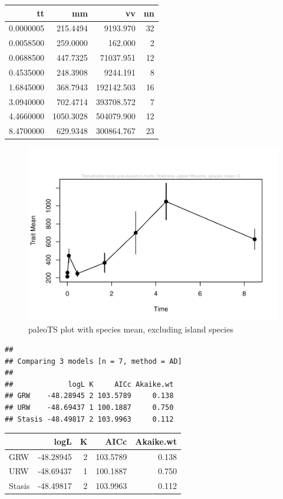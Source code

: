 \documentclass[]{article}
\begin{document}
\begin{longtable}[]{@{}rrrr@{}}
\toprule
tt & mm & vv & nn\tabularnewline
\midrule
\endhead
0.0000005 & 215.4494 & 9193.970 & 32\tabularnewline
0.0058500 & 259.0000 & 162.000 & 2\tabularnewline
0.0688500 & 447.7325 & 71037.951 & 12\tabularnewline
0.4535000 & 248.3908 & 9244.191 & 8\tabularnewline
1.6845000 & 368.7943 & 192142.503 & 16\tabularnewline
3.0940000 & 702.4714 & 393708.572 & 7\tabularnewline
4.4660000 & 1050.3028 & 504079.900 & 12\tabularnewline
8.4700000 & 629.9348 & 300864.767 & 23\tabularnewline
\bottomrule
\end{longtable}

\begin{figure}[htbp]
\centering
\includegraphics{MA_JJ_files/figure-latex/paleoTS plot with species mean, excluding island species-1.pdf}
\caption{paleoTS plot with species mean, excluding island species}
\end{figure}

\begin{verbatim}
## 
## Comparing 3 models [n = 7, method = AD]
## 
##             logL K     AICc Akaike.wt
## GRW    -48.28945 2 103.5789     0.138
## URW    -48.69437 1 100.1887     0.750
## Stasis -48.49817 2 103.9963     0.112
\end{verbatim}

\begin{longtable}[]{@{}lrrrr@{}}
\toprule
& logL & K & AICc & Akaike.wt\tabularnewline
\midrule
\endhead
GRW & -48.28945 & 2 & 103.5789 & 0.138\tabularnewline
URW & -48.69437 & 1 & 100.1887 & 0.750\tabularnewline
Stasis & -48.49817 & 2 & 103.9963 & 0.112\tabularnewline
\bottomrule
\end{longtable}
\end{document}
